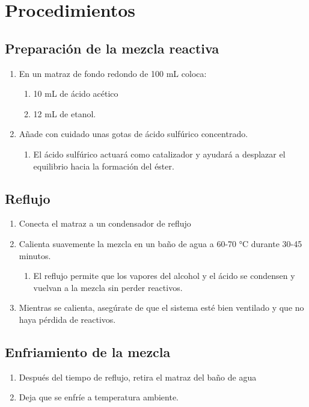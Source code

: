\section{Procedimientos}

\subsection{Preparación de la mezcla reactiva}
\begin{enumerate}
    \item En un matraz de fondo redondo de 100 mL coloca:
    \begin{enumerate}
        \item 10 mL de ácido acético
        \item 12 mL de etanol.
    \end{enumerate}
    
    \item Añade con cuidado unas gotas de ácido sulfúrico concentrado.
    \begin{enumerate}
        \item El ácido sulfúrico actuará como catalizador y ayudará a desplazar el equilibrio hacia la formación del éster.
    \end{enumerate}
    
\end{enumerate}

\subsection{Reflujo}
\begin{enumerate}
    \item Conecta el matraz a un condensador de reflujo
    \item Calienta suavemente la mezcla en un baño de agua a 60-70 °C durante 30-45 minutos.
    \begin{enumerate}
        \item El reflujo permite que los vapores del alcohol y el ácido se condensen y vuelvan a la mezcla sin perder reactivos.
    \end{enumerate}
    
    \item Mientras se calienta, asegúrate de que el sistema esté bien ventilado y que no haya pérdida de reactivos.
\end{enumerate}

\subsection{Enfriamiento de la mezcla}
\begin{enumerate}
    \item Después del tiempo de reflujo, retira el matraz del baño de agua
    \item Deja que se enfríe a temperatura ambiente.
\end{enumerate}

